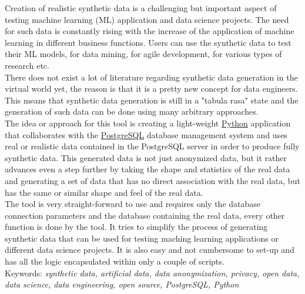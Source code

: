 Creation of realistic synthetic data is a challenging but important aspect of testing machine learning (ML) application and data science projects. The need for such data is constantly rising with the increase of the application of machine learning in different business functions. Users can use the synthetic data to test their ML models, for data mining, for agile development, for various types of research etc.\\
\newline
There does not exist a lot of literature regarding synthetic data generation in the virtual world yet, the reason is that it is a pretty new concept for data engineers. This means that synthetic data generation is still in a "tabula rasa" state and the generation of such data can be done using many arbitrary approaches.\\
\newline
The idea or approach for this tool is creating a light-weight \href{https://en.wikipedia.org/wiki/Python_(programming_language)}{Python} application that collaborates with the \href{https://en.wikipedia.org/wiki/PostgreSQL}{PostgreSQL} database management system and uses real or realistic data contained in the PostgreSQL server in order to produce fully synthetic data. This generated data is not just anonymized data, but it rather advances even a step further by taking the shape and statistics of the real data and generating a set of data that has no direct association with the real data, but has the same or similar shape and feel of the real data.\\
\newline
The tool is very straight-forward to use and requires only the database connection parameters and the database containing the real data, every other function is done by the tool. It tries to simplify the process of generating synthetic data that can be used for testing maching learning applications or different data science projects. It is also easy and not cumbersome to set-up and has all the logic encapsulated within only a couple of scripts.\\
\newline
Keywords: \textit{synthetic data, artificial data, data anonymization, privacy, open data, data science, data engineering, open source, PostgreSQL, Python}